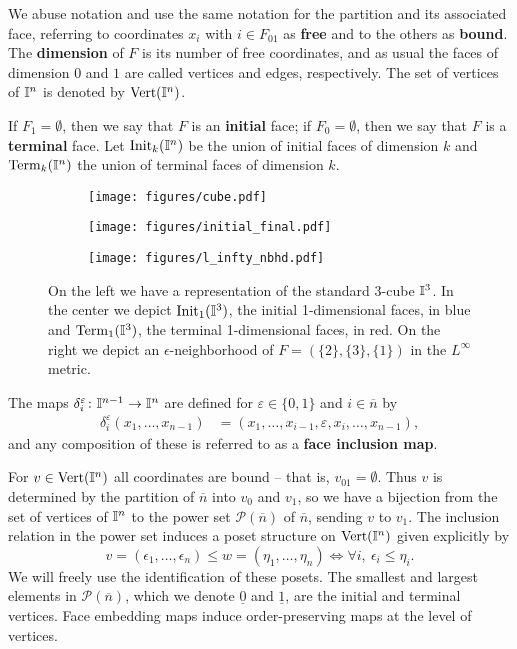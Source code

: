 We abuse notation and use the same notation for the partition and its associated face, referring to coordinates $x_i$ with $i \in F_{01}$ as \textbf{free}
and to the others as \textbf{bound}.
The \textbf{dimension} of $F$ is its number of free coordinates, and as usual the faces of dimension $0$ and $1$ are called vertices and edges, respectively.
The set of vertices of $\mathbb{I}^n$ is denoted by ${\rm Vert}(\mathbb{I}^n)$.

If $F_1 = \emptyset$, then we say that $F$ is an \textbf{initial} face; if $F_0 = \emptyset$, then we say that $F$ is a \textbf{terminal} face.
Let ${\rm Init}_k(\mathbb{I}^n)$ be the union of initial faces of dimension $k$ and ${\rm Term}_k(\mathbb{I}^n)$ the union of terminal faces of dimension $k$.

\begin{figure}[!h]
	\begin{subfigure}[b]{0.3\textwidth}
		\centering
		\texttt{[image: figures/cube.pdf]}
	\end{subfigure}
	\hfill
	\begin{subfigure}[b]{0.3\textwidth}
		\centering
		\texttt{[image: figures/initial\_final.pdf]}
	\end{subfigure}
	\hfill
	\begin{subfigure}[b]{0.3\textwidth}
		\centering
		\texttt{[image: figures/l\_infty\_nbhd.pdf]}
	\end{subfigure}
	\caption{On the left we have a representation of the standard $3$-cube $\mathbb{I}^3$.
		In the center we depict ${\rm Init}_1(\mathbb{I}^3)$, the initial 1-dimensional faces, in blue and ${\rm Term}_1(\mathbb{I}^3)$, the terminal 1-dimensional faces, in red. On the right we depict an $\epsilon$-neighborhood of $F = (\{2\}, \{3\}, \{1\})$ in the $L^\infty$ metric.}
\end{figure}

The maps $\delta_i^\varepsilon \colon \mathbb{I}^{n-1} \to \mathbb{I}^{n}$ are defined for $\varepsilon \in \{0, 1\}$ and $i \in \overline{n}$ by
\begin{align*}
	\delta_i^\varepsilon(x_1, \dots, x_{n-1}) & = (x_1, \dots, x_{i-1}, \varepsilon, x_i, \dots, x_{n-1}),
\end{align*}
and any composition of these is referred to as a \textbf{face inclusion map}.

For $v \in {\rm Vert}(\mathbb{I}^n)$ all coordinates are bound -- that is, $v_{01} = \emptyset$. Thus
$v$ is determined by the partition of $\overline n$ into $v_0$ and $v_1$, so
we have a bijection from the set of vertices of $\mathbb{I}^n$ to the power set $\mathcal P(\overline n)$ of $\overline n$, sending $v$ to $v_1$.
The inclusion relation in the power set induces a poset structure on ${\rm Vert}(\mathbb{I}^n)$ given explicitly by
\begin{equation*}
	v = (\epsilon_1, \dots, \epsilon_n) \leq w = (\eta_1, \dots, \eta_n) \iff \forall i,\ \epsilon_i \leq \eta_i.
\end{equation*}
We will freely use the identification of these posets.
The smallest and largest elements in $\mathcal P(\overline{n})$, which we denote $\underline{0}$ and $\underline{1}$, are the
initial and terminal vertices. Face embedding maps induce order-preserving maps at the level of vertices.

